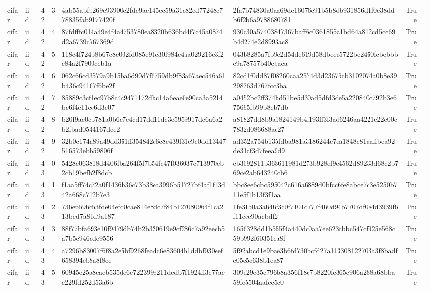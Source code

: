 \begin{tabular}{llrrllrl}
cifar & iid & 42 & 3 & 4ab55abfb269e93900e2fde9ac145ec59a31c82ed77248c778835fab9177420f & 2fa7b74830a0aa69de16076c91b5b8db931856d1f0c38ddb6f2b6a9788680781 & True &  \\
cifar & iid & 42 & 4 & 87fdfffc014a49e4f4a4753780ea8320b636bd4f7c45a0874d2a6739c767369d & 930c30a57403847367baff6c0361855a1bd64a812cd5cc69b4d274e2d8993ac8 & True &  \\
cifar & iid & 42 & 5 & 118c4f724b8b67c8e002fd085e91e30f984c4aa029216c3f2c84a2f7900ceb1a & 043b8285a7fb9e2d54de619d58dbeec5722be2460fcbebbbc9a78757b40ebaca & True &  \\
cifar & iid & 42 & 6 & 062c66cd3579a9b15ba6d90d7f6759db9f83a67aec546a61b436c94167f6be2f & 82cd1f0dd87f08260caa2574d3d23676cb3102074a0b8e39298363d767fcc3ba & True &  \\
cifar & iid & 42 & 7 & 85889c3cf1ec97b8c4c9471172dbc14a6eae0e90ca3a5214bc6f4c11ce6d3e07 & a0452bc2ff374bd51be5d30ad5dfd3de5a220840c792b3e675695fb99b8eb7db & True &  \\
cifar & iid & 42 & 8 & b20f9ac0cb781a0b6c7e4cd17dd11dc3e5959917dc6a6a2b2fbad0544167dce2 & a81827dd8b9a1824149b4f193ff3f3ad6246aa4221e22e00c7832d086688ac27 & True &  \\
cifar & iid & 42 & 9 & 32b0c174a89a49dd361ff354842e6c8c439f31e9c0dd13447516573ebb59806f & ad352a754b135fdba981a3186244c7ea1848c81aaffbea92de31cf3d7feea9d9 & True &  \\
cifar & iid & 43 & 0 & 5428c063818d4406fba264f5f7b54fc47f036037c713970cb2cb19befb2f8dcb & cb3092811b368611981d273b928ef9e4562d89233d68c2b769ce2ab643240cb6 & True &  \\
cifar & iid & 43 & 1 & f1aa5ff74c72a0f1436b36c73b38ea3996b51727bf4af1f13d42a668c712b7e3 & bbc8ee6cbc595042c616a6889d0bfcc6fe8abce7c3e5250b711e5f1b13f3f1aa & True &  \\
cifar & iid & 43 & 2 & 736e6596c53fde04efd0cae814e8dc7f84b127080964f1ca213bed7a81d9a187 & 1fe3150a3a646f3c0f7101d777f460d94b7707df0e4d3939f6f11ccc90acbdf2 & True &  \\
cifar & iid & 43 & 3 & 88f77bfa693e10f9479db74b2b320619e9cf286c7a92eecb5a7b5c946cde9556 & 1656328dd1b555f4a440dc0aa7ee623cbbc547cf925e568c59b992f60351ea8f & True &  \\
cifar & iid & 43 & 4 & a7296b83007f6f8a2e5bf9268feadc6e83604b1ddbf030eef658394eb8a8f8ee & 5f92abcd1e9bae3b6fd730bcfd27a113308122703a3f8badfe05c5c638b1ea87 & True &  \\
cifar & iid & 43 & 5 & 60945e25a8caeb535de6e722399c211dedb7f1924ff3e77aec229fd252d53a6b & 309e29e35c796b8a356f18c7b8220fe365c906a288a68bba59fe5504aafcc5c0 & True &  \\

\end{tabular}
